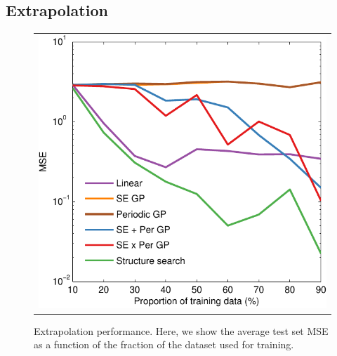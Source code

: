 \documentclass[twoside]{article}
\begin{document}
\subsection{Extrapolation}

\begin{figure}[h!]
\centering
\begin{tabular}{c}
\hspace{-0.5cm} \includegraphics[width=0.95\columnwidth]{../figures/extrapolation_curves/01-airline-s-ex-curve_hint.pdf}
\end{tabular}
\caption{Extrapolation performance.  Here, we show the average test set MSE as a function of the fraction of the dataset used for training. }
\label{fig:extrapolation}
\end{figure}
\end{document}
